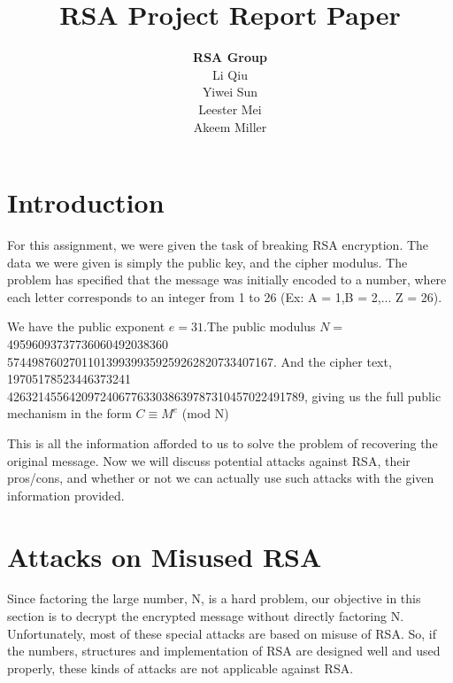 \documentclass[12pt]{article} %
\title{RSA Project Report Paper}
\author{\textbf{RSA Group}\\Li Qiu\\Yiwei Sun\\Leester Mei\\Akeem Miller}
\begin{document}
	\maketitle
	
	\section{Introduction}
	For this assignment, we were given the task of breaking RSA encryption. The data we were given is simply the public key, and the cipher modulus. The problem has specified that the message was initially encoded to a number, where each letter corresponds to an integer from 1 to 26 (Ex: A = 1,B = 2,... Z = 26).
	
	We have the public exponent $ e = 31 $.The public modulus $N=$  49596093737736060492038360\\5744987602701101399399359259262820733407167.
	And the cipher text, 19705178523446373241\\426321455642097240677633038639787310457022491789, giving us the full public mechanism in the form $ C \equiv M^{e} $ (mod N) 
	
	\indent This is all the information afforded to us to solve the problem of recovering the original message. Now we will discuss potential attacks against RSA, their pros/cons, and whether or not we can actually use such attacks with the given information provided.
	
	\section{Attacks on Misused RSA}
	Since factoring the large number, N, is a hard problem, our objective in this section is to decrypt the encrypted message without directly factoring N.
	Unfortunately, most of these special attacks are based on misuse of RSA.
	So, if the numbers, structures and implementation of RSA are designed well and used properly, these kinds of attacks are not applicable against RSA.
	
\end{document}
